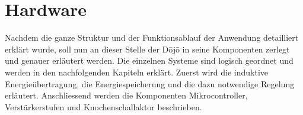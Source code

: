 \section{Hardware}\label{sec:hardware}
Nachdem die ganze Struktur und der Funktionsablauf der Anwendung detailliert erklärt wurde, soll nun an dieser Stelle der Dōjō in seine Komponenten zerlegt und genauer erläutert werden. Die einzelnen Systeme sind logisch geordnet und werden in den nachfolgenden Kapiteln erklärt. Zuerst wird die induktive Energieübertragung, die Energiespeicherung und die dazu notwendige Regelung erläutert. Anschliessend werden die Komponenten Mikrocontroller, Verstärkerstufen und Knochenschallaktor beschrieben.